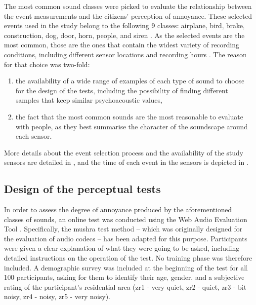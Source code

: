 The most common sound classes were picked to evaluate the relationship between the event measurements and the citizens' perception of annoyance. These selected events used in the study belong to the following 9 classes: airplane, bird, brake, construction, dog, door, horn, people, and siren \citep{Orga2017Impact}. As the selected events are the most common, those are the ones that contain the widest variety of recording conditions, including different sensor locations and recording hours \citep{LabairuTrenchs2018Noise}. The reason for that choice was two-fold:

\begin{enumerate}
  \item the availability of a wide range of examples of each type of sound to choose for the design of the tests, including the possibility of finding different samples that keep similar psychoacoustic values,
  \item the fact that the most common sounds are the most reasonable to evaluate with people, as they best summarise the character of the soundscape around each sensor.
\end{enumerate}
More details about the event selection process and the availability of the study sensors are detailed in \citep{LabairuTrenchs2018Noise}, and the time of each event in the sensors is depicted in \citep{AlsinaPages2021Perceptual}.

\subsection{Design of the perceptual tests}
\label{sec:DYNAMAPTests}
In order to assess the degree of annoyance produced by the aforementioned classes of sounds, an online test was conducted using the Web Audio Evaluation Tool \citep{Jillings2015Web}. Specifically, the \gls{mushra} test method \citep{IRB2015Method} -- which was originally designed for the evaluation of audio codecs -- has been adapted for this purpose. Participants were given a clear explanation of what they were going to be asked, including detailed instructions on the operation of the test. No training phase was therefore included. A demographic survey was included at the beginning of the test for all 100 participants, asking for them to identify their age, gender, and a subjective rating of the participant's residential area (zr1 - very quiet, zr2 - quiet, zr3 - bit noisy, zr4 - noisy, zr5 - very noisy).


